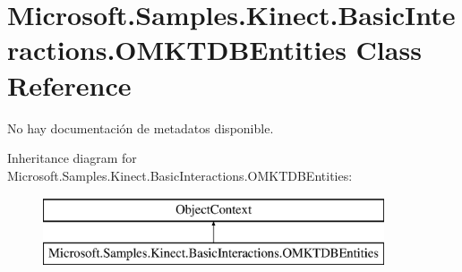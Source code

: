 \hypertarget{class_microsoft_1_1_samples_1_1_kinect_1_1_basic_interactions_1_1_o_m_k_t_d_b_entities}{\section{Microsoft.\-Samples.\-Kinect.\-Basic\-Interactions.\-O\-M\-K\-T\-D\-B\-Entities Class Reference}
\label{class_microsoft_1_1_samples_1_1_kinect_1_1_basic_interactions_1_1_o_m_k_t_d_b_entities}
}


No hay documentación de metadatos disponible.  


Inheritance diagram for Microsoft.\-Samples.\-Kinect.\-Basic\-Interactions.\-O\-M\-K\-T\-D\-B\-Entities\-:\begin{figure}[H]
\begin{center}
\leavevmode
\includegraphics[height=2.000000cm]{class_microsoft_1_1_samples_1_1_kinect_1_1_basic_interactions_1_1_o_m_k_t_d_b_entities}
\end{center}
\end{figure}
